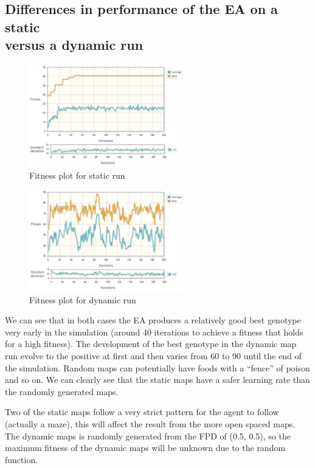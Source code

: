 \newpage %

\subsection{Differences in performance of the EA on a static \\versus a dynamic run}
\begin{figure}[h]
  \centering
    \includegraphics[width=0.6\textwidth]{img/Flatland_static}
    \caption{Fitness plot for static run}
\end{figure}

\begin{figure}[h]
  \centering
    \includegraphics[width=0.6\textwidth]{img/Flatland_dynamic}
    \caption{Fitness plot for dynamic run}
\end{figure}

We can see that in both cases the EA produces a relatively good best genotype very early in the simulation (around 40 iterations to achieve a fitness that holds for a high fitness). The development of the best genotype in the dynamic map run evolve to the positive at first and then varies from 60 to 90 until the end of the simulation. Random maps can potentially have foods with a ``fence'' of poison and so on. We can clearly see that the static maps have a safer learning rate than the randomly generated maps.


Two of the static maps follow a very strict pattern for the agent to follow (actually a maze), this will affect the result from the more open spaced maps. The dynamic maps is randomly generated from the FPD of (0.5, 0.5), so the maximum fitness of the dynamic maps will be unknown due to the random function.

